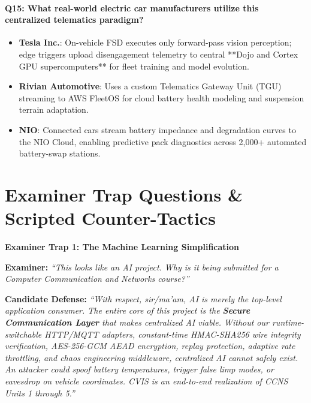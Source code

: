 \documentclass[12pt,a4paper]{report}
\newenvironment{dialoguebox}[1]{%
  \begin{mdframed}[backgroundcolor=cvislightbg,
    linecolor=cvisteal,linewidth=1.5pt,
    innerleftmargin=10pt,innerrightmargin=10pt,
    innertopmargin=6pt,innerbottommargin=6pt]
  \textbf{\color{cvisblue}#1}\par\smallskip}
  {\end{mdframed}}
\begin{document}
\paragraph{Q15: What real-world electric car manufacturers utilize this centralized telematics paradigm?}
\begin{itemize}[leftmargin=*,nosep]
  \item \textbf{Tesla Inc.}: On-vehicle FSD executes only forward-pass vision perception; edge triggers upload disengagement telemetry to central **Dojo and Cortex GPU supercomputers** for fleet training and model evolution.
  \item \textbf{Rivian Automotive}: Uses a custom Telematics Gateway Unit (TGU) streaming to AWS FleetOS for cloud battery health modeling and suspension terrain adaptation.
  \item \textbf{NIO}: Connected cars stream battery impedance and degradation curves to the NIO Cloud, enabling predictive pack diagnostics across 2,000+ automated battery-swap stations.
\end{itemize}

\section{Examiner Trap Questions \& Scripted Counter-Tactics}

\begin{dialoguebox}{Examiner Trap 1: The Machine Learning Simplification}
\textbf{Examiner:} \textit{``This looks like an AI project. Why is it being submitted for a Computer Communication and Networks course?''}

\textbf{Candidate Defense:} 
\textit{``With respect, sir/ma'am, AI is merely the top-level application consumer. The entire core of this project is the \textbf{Secure Communication Layer} that makes centralized AI viable. Without our runtime-switchable HTTP/MQTT adapters, constant-time HMAC-SHA256 wire integrity verification, AES-256-GCM AEAD encryption, replay protection, adaptive rate throttling, and chaos engineering middleware, centralized AI cannot safely exist. An attacker could spoof battery temperatures, trigger false limp modes, or eavesdrop on vehicle coordinates. CVIS is an end-to-end realization of CCNS Units 1 through 5.''}
\end{dialoguebox}
\end{document}
